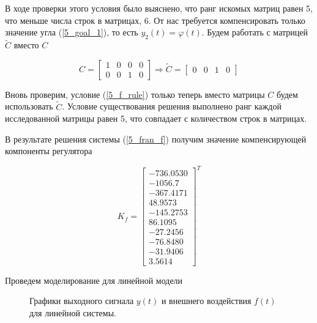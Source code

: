 В ходе проверки этого условия было выяснено, что ранг искомых матриц равен 5, что меньше числа строк в матрицах, 6. От нас требуется компенсировать только значение угла (\ref{5_goal_1}), то есть $y_2(t) = \varphi(t)$. Будем работать с матрицей $\tilde{C}$ вместо $C$

\begin{equation}
    C = \begin{bmatrix}
        1 & 0 & 0 & 0\\
        0 & 0 & 1 & 0
    \end{bmatrix} \Rightarrow 
    \tilde{C} =\begin{bmatrix}
        0 & 0 & 1 & 0
    \end{bmatrix} 
\end{equation}

Вновь проверим, условие (\ref{5_f_rule}) только теперь вместо матрицы $C$ будем использовать $\tilde{C}$. Условие существования решения выполнено ранг каждой исследованной матрицы равен 5, что совпадает с количеством строк в матрицах.

В результате решения системы (\ref{5_fran_f}) получим значение компенсирующей компоненты регулятора

\begin{equation}
    K_f = \begin{bmatrix}
        -736.0530	\\-1056.7\\-367.4171	\\48.9573	\\-145.2753	\\86.1095	\\-27.2456	\\-76.8480	\\-31.9406	\\3.5614
    \end{bmatrix}^T
\end{equation}

Проведем моделирование для линейной модели 

\begin{figure}[!h]
\caption{Графики выходного сигнала $y(t)$ и внешнего воздействия $f(t)$ для линейной системы.}
\label{5_f_lin}
\end{figure}

